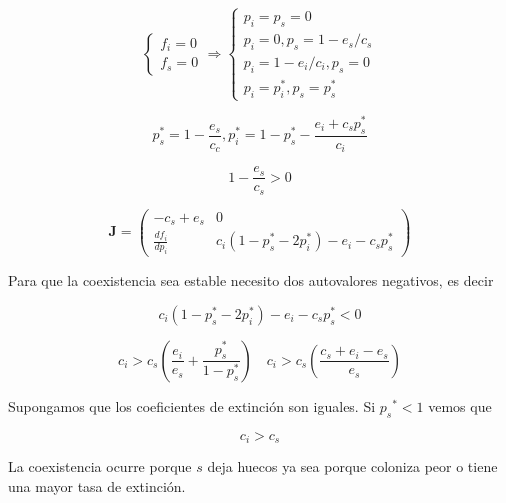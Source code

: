 \documentclass[twocolumn,aps,prl]{revtex4-1}
\begin{document}
$$
\left\{
\begin{array} { l } 
    { f _ { i } = 0 } \\
    { f _ { s } = 0 }
\end{array} 
\right. 
\Rightarrow 
\left\{
\begin{array}{l}
    p_{i}=p_{s}=0 \\
    p_{i}=0, p_{s}=1-e_{s} / c_{s} \\
    p_{i}=1-e_{i} / c_{i}, p_{s}=0 \\
    p_{i}=p_{i}^{*}, p_{s}=p_{s}^{*}
\end{array}
\right.
$$



$$
p_{s}^{*}=1-\frac{e_{s}}{c_{c}}, p_{i}^{*}=1-p_{s}^{*}-\frac{e_{i}+c_{s} p_{s}^{*}}{c_{i}}
$$

$$
1 - \frac{e_{s}}{c_{s}} > 0
$$

\begin{equation}
    \mathbf{J}=\left(
    \begin{array}{cc}
        -c_{s}+e_{s} & 0 \\
        \frac{d f_{i}}{d p_{i}} & c_{i}\left(1-p_{s}^{*}-2 p_{i}^{*}\right)-e_{i}-c_{s} p_{s}^{*}
    \end{array}
    \right)
\end{equation}

Para que la coexistencia sea estable necesito dos autovalores negativos, es decir

$$
c_{i}\left(1-p_{s}^{*}-2 p_{i}^{*}\right)-e_{i}-c_{s} p_{s}^{*}<0
$$

$$
c_{i}>c_{s}\left(\frac{e_{i}}{e_{s}}+\frac{p_{s}^{*}}{1-p_{s}^{*}}\right) \quad c_{i}>c_{s}\left(\frac{c_{s}+e_{i}-e_{s}}{e_{s}}\right)
$$

Supongamos que los coeficientes de extinción son iguales. Si $p_{s}{ }^{*}<1$ vemos que

$$
c_{i}>c_{s}
$$

La coexistencia ocurre porque $s$ deja huecos ya sea porque coloniza peor o tiene una mayor tasa de extinción.

% 
\end{document}
